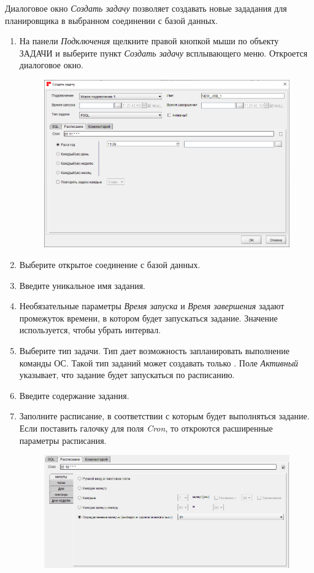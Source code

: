 

Диалоговое окно \textit{Создать задачу} позволяет создавать новые зададания для планировщика в выбранном соединении с базой данных.

\begin{enumerate}[leftmargin=26pt]
	\item На панели \textit{Подключения} щелкните правой кнопкой мыши по объекту ЗАДАЧИ и выберите пункт \textit{Создать задачу} всплывающего меню. Откроется диалоговое окно.
	\begin{figure}[H]
		\centering
		\includegraphics[width = 0.6\linewidth]{img/create_job.png}
	\end{figure}
	\item Выберите открытое соединение с базой данных.
	\item Введите уникальное имя задания.
	\item Необязательные параметры \textit{Время запуска} и \textit{Время завершения} задают промежуток времени, в котором будет запускаться задание. Значение  используется, чтобы убрать интервал. 
	\item Выберите тип задачи. Тип  дает возможность запланировать выполнение команды ОС. Такой тип заданий может создавать только . Поле \textit{Активный} указывает, что задание будет запускаться по расписанию. 
	\item Введите содержание задания. 
	\item Заполните расписание, в соответствии с которым будет выполняться задание. Если поставить галочку для поля \textit{Cron}, то откроются расширенные параметры расписания.
	\begin{figure}[H]
		\centering
		\includegraphics[width = 0.6\linewidth]{img/create_job_cron.png}
	\end{figure}
\end{enumerate}

